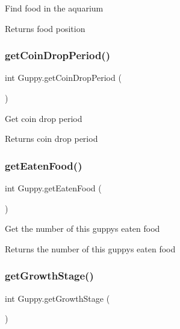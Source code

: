 Find food in the aquarium \begin{DoxyReturn}{Returns}
food position 
\end{DoxyReturn}
\mbox{\label{class_guppy_ac34adfb8d8a864549629ccb5ebd3ec9a}} 
\subsubsection{\texorpdfstring{get\+Coin\+Drop\+Period()}{getCoinDropPeriod()}}
{\footnotesize\ttfamily int Guppy.\+get\+Coin\+Drop\+Period (\begin{DoxyParamCaption}{ }\end{DoxyParamCaption})\hspace{0.3cm}{\ttfamily [inline]}}

Get coin drop period \begin{DoxyReturn}{Returns}
coin drop period 
\end{DoxyReturn}
\mbox{\label{class_guppy_a746ba5508dd9c3413930531de72d13ad}} 
\subsubsection{\texorpdfstring{get\+Eaten\+Food()}{getEatenFood()}}
{\footnotesize\ttfamily int Guppy.\+get\+Eaten\+Food (\begin{DoxyParamCaption}{ }\end{DoxyParamCaption})\hspace{0.3cm}{\ttfamily [inline]}}

Get the number of this guppy\textquotesingle{}s eaten food \begin{DoxyReturn}{Returns}
the number of this guppy\textquotesingle{}s eaten food 
\end{DoxyReturn}
\mbox{\label{class_guppy_adb7ebe1e642a9aa30e31821343982a4b}} 
\subsubsection{\texorpdfstring{get\+Growth\+Stage()}{getGrowthStage()}}
{\footnotesize\ttfamily int Guppy.\+get\+Growth\+Stage (\begin{DoxyParamCaption}{ }\end{DoxyParamCaption})\hspace{0.3cm}{\ttfamily [inline]}}

